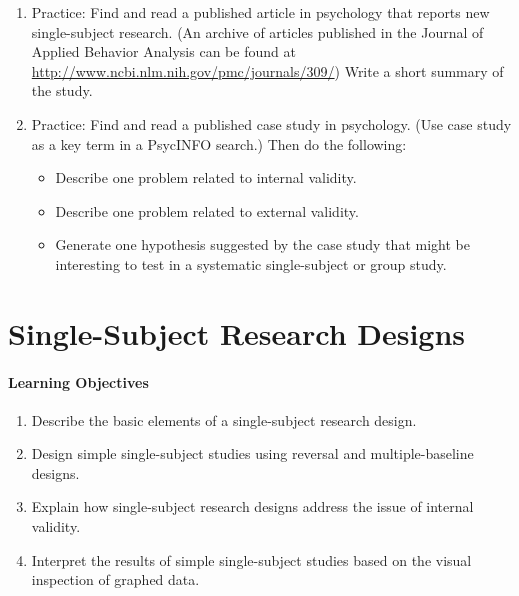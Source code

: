 \begin{fullwidth}

\begin{enumerate}

\item  Practice: Find and read a published article in psychology that reports new single-subject
research. (An archive of articles published in the Journal of Applied Behavior Analysis can be found at \url{http://www.ncbi.nlm.nih.gov/pmc/journals/309/}) Write a short summary of the study.


\item Practice: Find and read a published case study in psychology. (Use case study as a key term in a PsycINFO search.) Then do the following:

\begin{itemize}
\item Describe one problem related to internal validity.
\item Describe one problem related to external validity.
\item Generate one hypothesis suggested by the case study that might be interesting to test in a
systematic single-subject or group study.
\end{itemize}


\end{enumerate}

\end{fullwidth}

\newpage
\section{Single-Subject Research Designs}

\paragraph{Learning Objectives}
 \begin{enumerate}
 \item  Describe the basic elements of a single-subject research design.
 \item Design simple single-subject studies using reversal and multiple-baseline designs.
 \item Explain how single-subject research designs address the issue of internal validity.
 \item Interpret the results of simple single-subject studies based on the visual inspection of graphed data.
   \end{enumerate}


